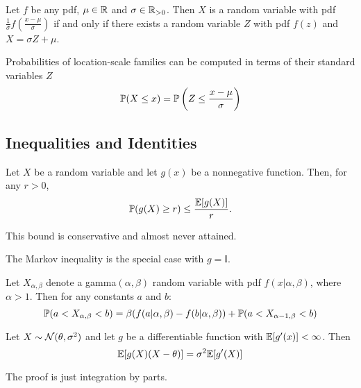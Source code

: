 \begin{theorem}[Standardisation]
    Let $f$ be any pdf, $\mu \in \R{}$ and $\sigma \in \R{}_{>0}$. Then $X$ is a random variable with pdf $\frac{1}{\sigma}f(\frac{x - \mu}{\sigma})$ if and only if there exists a random variable $Z$ with pdf $f(z)$ and $X = \sigma Z + \mu$.
\end{theorem}

\begin{remark}
    Probabilities of location-scale families can be computed in terms of their standard variables $Z$
    \[
        \P{}(X \leq x) = \P{}\left(Z \leq \frac{x - \mu}{\sigma} \right)
    \]
\end{remark}

\subsection{Inequalities and Identities}

\begin{theorem}
    Let $X$ be a random variable and let $g(x)$ be a nonnegative function. Then, for any $r > 0$,
    \[
        \P{}(g(X) \geq r) \leq \frac{\E{}[g(X)]}{r}.
    \]
\end{theorem}

\begin{remark}
    This bound is conservative and almost never attained. 
\end{remark}

\begin{remark}   
    The Markov inequality is the special case with $g = \mathbb{I}$.
\end{remark}

\begin{theorem}
    Let $X_{\alpha, \beta}$ denote a gamma$(\alpha, \beta)$ random variable with pdf $f(x \vert{} \alpha, \beta)$, where $\alpha > 1$. Then for any constants $a$ and $b$:
    \[
        \P{}(a < X_{\alpha, \beta} < b) = \beta (f(a \vert{} \alpha, \beta) - f(b \vert{} \alpha, \beta)) + \P{}(a < X_{\alpha - 1, \beta} < b)
    \]
\end{theorem}

\begin{lemma}
    Let $X \sim \n(\theta, \sigma^2)$ and let $g$ be a differentiable function with $\E{}[g'(x)] < \infty$. Then
    \[
        \E{}[g(X)(X - \theta)] = \sigma^2 \E{}[g'(X)]
    \]
\end{lemma}
The proof is just integration by parts.

